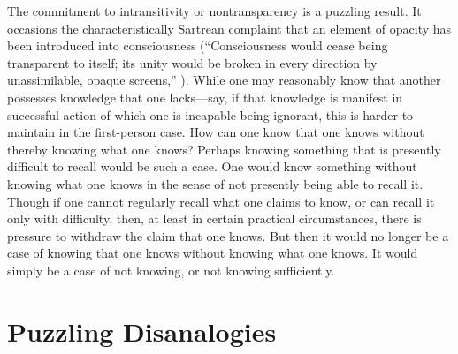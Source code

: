 The commitment to intransitivity or nontransparency is a puzzling result. It occasions the characteristically Sartrean complaint that an element of opacity has been introduced into consciousness (``Consciousness would cease being transparent to itself; its unity would be broken in every direction by unassimilable, opaque screens,'' \citealt[6]{Sartre:1963aa}). While one may reasonably know that another possesses knowledge that one lacks—say, if that knowledge is manifest in successful action of which one is incapable being ignorant, this is harder to maintain in the first-person case. How can one know that one knows without thereby knowing what one knows? Perhaps knowing something that is presently difficult to recall would be such a case. One would know something without knowing what one knows in the sense of not presently being able to recall it. Though if one cannot regularly recall what one claims to know, or can recall it only with difficulty, then, at least in certain practical circumstances, there is pressure to withdraw the claim that one knows. But then it would no longer be a case of knowing that one knows without knowing what one knows. It would simply be a case of not knowing, or not knowing sufficiently.



\section{Puzzling Disanalogies} %
\label{sec:puzzling_disanalogies}

